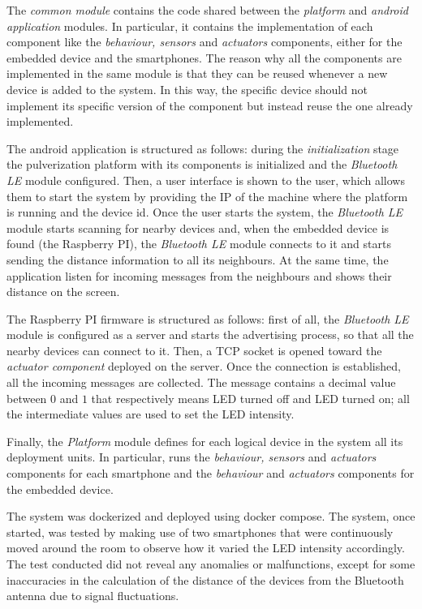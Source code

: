 The \emph{common module} contains the code shared between the \emph{platform} and \emph{android application} modules. In particular, it contains
the implementation of each component like the \emph{behaviour, sensors} and \emph{actuators} components, either for the embedded device and the
smartphones. The reason why all the components are implemented in the same module is that they can be reused whenever a new device is added to the
system. In this way, the specific device should not implement its specific version of the component but instead reuse the one already implemented.

The android application is structured as follows: during the \emph{initialization} stage the pulverization platform with its components is
initialized and the \emph{Bluetooth LE} module configured. Then, a user interface is shown to the user, which allows them to start the system by
providing the IP of the machine where the platform is running and the device id. Once the user starts the system, the \emph{Bluetooth LE} module
starts scanning for nearby devices and, when the embedded device is found (the Raspberry PI), the \emph{Bluetooth LE} module connects to it and
starts sending the distance information to all its neighbours. At the same time, the application listen for incoming messages from the neighbours
and shows their distance on the screen.

The Raspberry PI firmware is structured as follows: first of all, the \emph{Bluetooth LE} module is configured as a server and starts the
advertising process, so that all the nearby devices can connect to it. Then, a TCP socket is opened toward the \emph{actuator component} deployed
on the server. Once the connection is established, all the incoming messages are collected. The message contains a decimal value between $0$ and $1$
that respectively means LED turned off and LED turned on; all the intermediate values are used to set the LED intensity.

Finally, the \emph{Platform} module defines for each logical device in the system all its deployment units. In particular, runs the
\emph{behaviour, sensors} and \emph{actuators} components for each smartphone and the \emph{behaviour} and \emph{actuators} components for the
embedded device.

The system was dockerized and deployed using docker compose. The system, once started, was tested by making use of two smartphones that were
continuously moved around the room to observe how it varied the LED intensity accordingly. The test conducted did not reveal any anomalies or
malfunctions, except for some inaccuracies in the calculation of the distance of the devices from the Bluetooth antenna due to signal
fluctuations.

